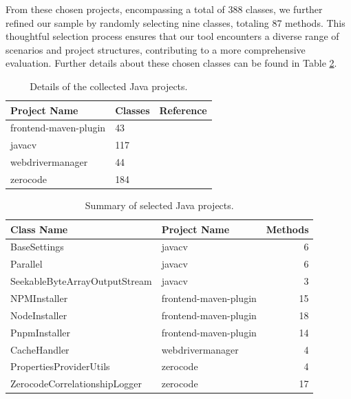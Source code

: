 From these chosen projects, encompassing a total of 388 classes, we further refined our sample by randomly selecting nine classes, totaling 87 methods. This thoughtful selection process ensures that our tool encounters a diverse range of scenarios and project structures, contributing to a more comprehensive evaluation. Further details about these chosen classes can be found in Table \ref{tab:selected_java_projects}.

\begin{table}
    \centering
    \begin{tabular}{l | l | r}
        \textbf{Project Name} & \textbf{Classes} & \textbf{Reference} \\
        \hline
        frontend-maven-plugin & 43 & \cite{sletteberg_frontend-maven-plugin_2023} \\
        javacv & 117 & \cite{noauthor_bytedecojavacv_nodate} \\
        webdrivermanager & 44 & \cite{noauthor_bonigarciawebdrivermanager_nodate} \\
        zerocode & 184 & \cite{noauthor_authorjappszerocode_nodate} \\
    \end{tabular}
\caption{Details of the collected Java projects.}
\label{tab:collected_java_projects}
\end{table}

\begin{table}
    \centering    
    \begin{tabular}{l | l | r}
        \textbf{Class Name} & \textbf{Project Name} & \textbf{Methods} \\
        \hline
        BaseSettings & javacv & 6 \\
        Parallel & javacv & 6 \\
        SeekableByteArrayOutputStream & javacv & 3 \\
        NPMInstaller & frontend-maven-plugin & 15 \\
        NodeInstaller & frontend-maven-plugin & 18 \\
        PnpmInstaller & frontend-maven-plugin & 14 \\
        CacheHandler & webdrivermanager & 4 \\
        PropertiesProviderUtils & zerocode & 4 \\
        ZerocodeCorrelationshipLogger & zerocode & 17 \\
    \end{tabular}
\caption{Summary of selected Java projects.}
\label{tab:selected_java_projects}
\end{table}

